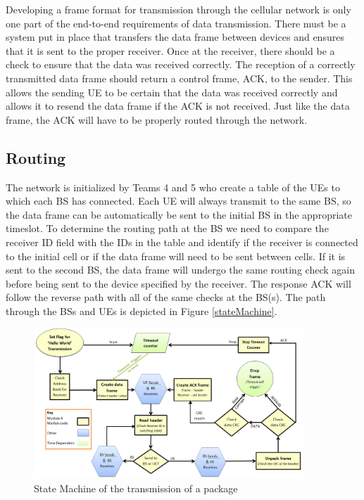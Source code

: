 Developing a frame format for transmission through the cellular network is only one part of the end-to-end requirements of data transmission. There must be a system put in place that transfers the data frame between devices and ensures that it is sent to the proper receiver. Once at the receiver, there should be a check to ensure that the data was received correctly. The reception of a correctly transmitted data frame should return a control frame, ACK, to the sender.  This allows the sending UE to be certain that the data was received correctly and allows it to resend the data frame if the ACK is not received. Just like the data frame, the ACK will have to be properly routed through the network. 

\subsection {Routing}

The network is initialized by Teams 4 and 5 who create a table of the UEs to which each BS has connected. Each UE will always transmit to the same BS, so the data frame can be automatically be sent to the initial BS in the appropriate timeslot.  To determine the routing path at the BS we need to compare the receiver ID field with the IDs in the table and identify if the receiver is connected to the initial cell or if the data frame will need to be sent between cells. If it is sent to the second BS, the data frame will undergo the same routing check again before being sent to the device specified by the receiver. The response ACK will follow the reverse path with all of the same checks at the BS(s). The path through the BSs and UEs is depicted in Figure \ref{stateMachine}.

\begin{figure}[ht]
    \centering
    \includegraphics[width=0.9\textwidth]{State_Machine_yellow.PNG}
    \caption{State Machine of the transmission of a package }
    \label{fig:stateMachine}
\end{figure}

